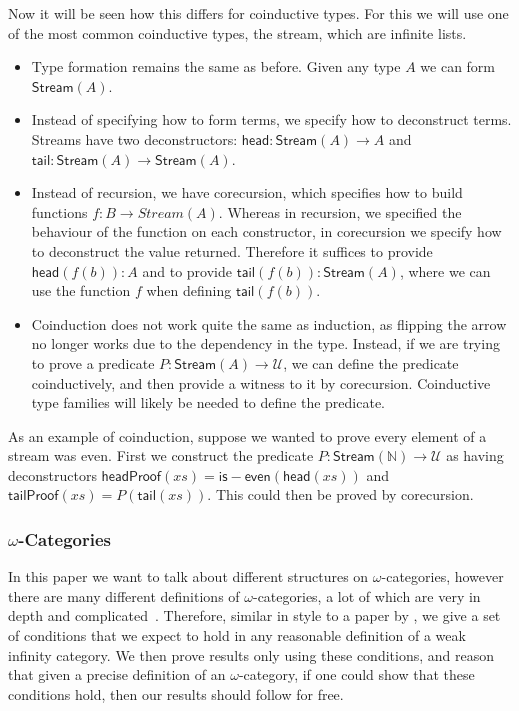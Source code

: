 \documentclass[draft]{article}
\begin{document}
Now it will be seen how this differs for coinductive types. For this
we will use one of the most common coinductive types, the stream,
which are infinite lists.

\begin{itemize}
\item Type formation remains the same as before. Given any type \(A\)
  we can form \(\mathsf{Stream}(A)\).
\item Instead of specifying how to form terms, we specify how to
  deconstruct terms. Streams have two deconstructors: \(\mathsf{head}
  : \mathsf{Stream}(A) \to A\) and \(\mathsf{tail} :
  \mathsf{Stream}(A) \to \mathsf{Stream}(A)\).
\item Instead of recursion, we have corecursion, which specifies how
  to build functions \(f : B \to Stream(A)\). Whereas in recursion, we
  specified the behaviour of the function on each constructor, in
  corecursion we specify how to deconstruct the value returned.
  Therefore it suffices to provide \(\mathsf{head}(f(b)) : A\) and to
  provide \(\mathsf{tail}(f(b)) : \mathsf{Stream}(A)\), where we can
  use the function \(f\) when defining \(\mathsf{tail}(f(b))\).
\item Coinduction does not work quite the same as induction, as
  flipping the arrow no longer works due to the dependency in the
  type. Instead, if we are trying to prove a predicate \(P :
  \mathsf{Stream}(A) \to \mathcal{U}\), we can define the predicate
  coinductively, and then provide a witness to it by corecursion.
  Coinductive type families will likely be needed to define the
  predicate.
\end{itemize}

As an example of coinduction, suppose we wanted to prove every element
of a stream was even. First we construct the predicate \(P :
\mathsf{Stream}(\mathbb{N}) \to \mathcal{U}\) as having deconstructors
\(\mathsf{headProof}(xs) = \mathsf{is{-}even}(\mathsf{head}(xs))\) and
\(\mathsf{tailProof}(xs) = P(\mathsf{tail}(xs))\). This could then be
proved by corecursion.

\subsubsection{\(\omega\)-Categories}\label{sec:categories}

In this paper we want to talk about different structures on
\(\omega\)-categories, however there are many different definitions of
\(\omega\)-categories, a lot of which are very in depth and
complicated~\cite{leinster2001survey}. Therefore, similar in style to a
paper by \textcite{Cheng2007}, we give a set of conditions that we
expect to hold in any reasonable definition of a weak infinity
category. We then prove results only using these conditions, and
reason that given a precise definition of an \(\omega\)-category, if
one could show that these conditions hold, then our results should
follow for free.
\end{document}
